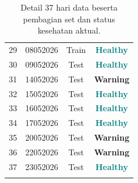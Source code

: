 \documentclass[11pt,a4paper]{article}
\newcommand{\healthy}{\textcolor{teal}{\textbf{Healthy}}}
\newcommand{\warning}{\textcolor{orange!80!black}{\textbf{Warning}}}
\begin{document}
\begin{longtable}{clcc}
    29 & 08052026 & Train & \healthy \\
    30 & 09052026 & Test  & \healthy \\
    31 & 14052026 & Test  & \warning \\
    32 & 15052026 & Test  & \healthy \\
    33 & 16052026 & Test  & \healthy \\
    34 & 17052026 & Test  & \healthy \\
    35 & 20052026 & Test  & \warning \\
    36 & 22052026 & Test  & \warning \\
    37 & 23052026 & Test  & \healthy \\
    \bottomrule
    \caption{Detail 37 hari data beserta pembagian set dan status kesehatan aktual.}
    \label{tab:days}
\end{longtable}
\end{document}
